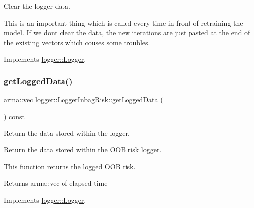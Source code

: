 Clear the logger data. 

This is an important thing which is called every time in front of retraining the model. If we don\textquotesingle{}t clear the data, the new iterations are just pasted at the end of the existing vectors which couses some troubles. 

Implements \hyperlink{classlogger_1_1_logger_a8c68db2430fa84b67528bfa6ae45a516}{logger\+::\+Logger}.

\mbox{\label{classlogger_1_1_logger_inbag_risk_abde2b1db608804ca90ce92cd0e5dde12}} 
\subsubsection{\texorpdfstring{get\+Logged\+Data()}{getLoggedData()}}
{\footnotesize\ttfamily arma\+::vec logger\+::\+Logger\+Inbag\+Risk\+::get\+Logged\+Data (\begin{DoxyParamCaption}{ }\end{DoxyParamCaption}) const\hspace{0.3cm}{\ttfamily [virtual]}}



Return the data stored within the logger. 

Return the data stored within the O\+OB risk logger.

This function returns the logged O\+OB risk.

\begin{DoxyReturn}{Returns}
{\ttfamily arma\+::vec} of elapsed time 
\end{DoxyReturn}


Implements \hyperlink{classlogger_1_1_logger_aa4fc254c532172db3404b7c0bcd17092}{logger\+::\+Logger}.

\mbox{\label{classlogger_1_1_logger_inbag_risk_aa7cb90600de663c51feaaf8a0715a0f9}} 
